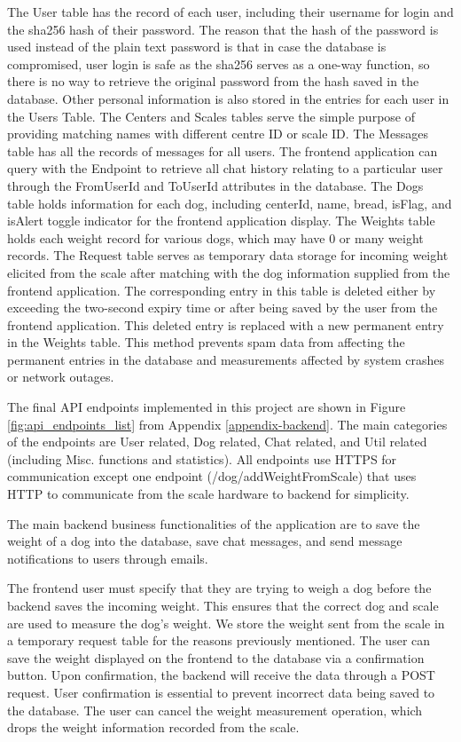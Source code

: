 The User table has the record of each user, including their username for login and the sha256 hash of their password. The reason that the hash of the password is used instead of the plain text password is that in case the database is compromised, user login is safe as the sha256 serves as a one-way function, so there is no way to retrieve the original password from the hash saved in the database. Other personal information is also stored in the entries for each user in the Users Table.
The Centers and Scales tables serve the simple purpose of providing matching names with different centre ID or scale ID.
The Messages table has all the records of messages for all users. The frontend application can query with the Endpoint to retrieve all chat history relating to a particular user through the FromUserId and ToUserId attributes in the database.
The Dogs table holds information for each dog, including centerId, name, bread, isFlag, and isAlert toggle indicator for the frontend application display. The Weights table holds each weight record for various dogs, which may have 0 or many weight records.
The Request table serves as temporary data storage for incoming weight elicited from the scale after matching with the dog information supplied from the frontend application. The corresponding entry in this table is deleted either by exceeding the two-second expiry time or after being saved by the user from the frontend application. This deleted entry is replaced with a new permanent entry in the Weights table. This method prevents spam data from affecting the permanent entries in the database and measurements affected by system crashes or network outages.


The final API endpoints implemented in this project are shown in Figure \ref{fig:api_endpoints_list} from Appendix \ref{appendix-backend}. The main categories of the endpoints are User related, Dog related, Chat related, and Util related (including Misc. functions and statistics). All endpoints use HTTPS for communication except one endpoint (/dog/addWeightFromScale) that uses HTTP to communicate from the scale hardware to backend for simplicity.


The main backend business functionalities of the application are to save the weight of a dog into the database, save chat messages, and send message notifications to users through emails.

The frontend user must specify that they are trying to weigh a dog before the backend saves the incoming weight. This ensures that the correct dog and scale are used to measure the dog's weight. We store the weight sent from the scale in a temporary request table for the reasons previously mentioned. The user can save the weight displayed on the frontend to the database via a confirmation button. Upon confirmation, the backend will receive the data through a POST request. User confirmation is essential to prevent incorrect data being saved to the database. The user can cancel the weight measurement operation, which drops the weight information recorded from the scale.

